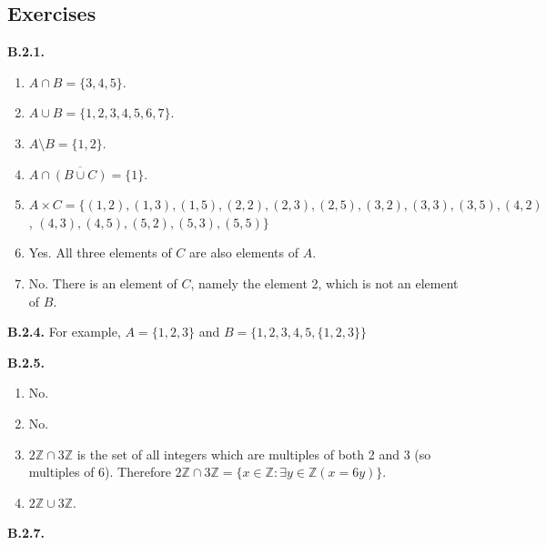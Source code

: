 \documentclass[10pt,]{book}
\theoremstyle{plain}
\theoremstyle{definition}
\theoremstyle{definition}
\theoremstyle{definition}
\theoremstyle{definition}
\numberwithin{equation}{chapter}
\def\Z{\mathbb Z}
\def\st{:}
\def\bar{\overline}
\begin{document}
\subsection*{ Exercises}
\noindent\textbf{B.2.1.} \hypertarget{p-1648}{}%
\leavevmode%
\begin{enumerate}[label=(\alph*)]
\item\hypertarget{li-489}{}\(A \cap B = \{3,4,5\}\).%
\item\hypertarget{li-490}{}\(A \cup B = \{1,2,3,4,5,6,7\}\).%
\item\hypertarget{li-491}{}\(A \setminus B = \{1,2\}\).%
\item\hypertarget{li-492}{}\(A \cap \bar{(B \cup C)} = \{1\}\).%
\item\hypertarget{li-493}{}\(A \times C = \{ (1,2), (1,3), (1,5), (2,2), (2,3), (2,5), (3,2), (3,3), (3,5), (4,2)\), \((4,3), (4,5), (5,2), (5,3), (5,5)\}\)%
\item\hypertarget{li-494}{}\hypertarget{p-1649}{}%
Yes.  All three elements of \(C\) are also elements of \(A\).%
\item\hypertarget{li-495}{}\hypertarget{p-1650}{}%
No. There is an element of \(C\), namely the element 2, which is not an element of \(B\).%
\end{enumerate}
%
\par\smallskip
\noindent\textbf{B.2.4.} \hypertarget{p-1659}{}%
For example, \(A = \{1,2,3\}\) and \(B = \{1,2,3,4,5,\{1,2,3\}\}\)%
\par\smallskip
\noindent\textbf{B.2.5.} \hypertarget{p-1666}{}%
\leavevmode%
\begin{enumerate}[label=(\alph*)]
\item\hypertarget{li-504}{}\hypertarget{p-1667}{}%
No.%
\item\hypertarget{li-505}{}\hypertarget{p-1668}{}%
No.%
\item\hypertarget{li-506}{}\(2\Z \cap 3\Z\) is the set of all integers which are multiples of both 2 and 3 (so multiples of 6). Therefore \(2\Z \cap 3\Z = \{x \in \Z \st \exists y\in \Z(x = 6y)\}\).%
\item\hypertarget{li-507}{}\(2\Z \cup 3\Z\).%
\end{enumerate}
%
\par\smallskip
\noindent\textbf{B.2.7.} \hypertarget{p-1671}{}%
\leavevmode%
\end{document}
